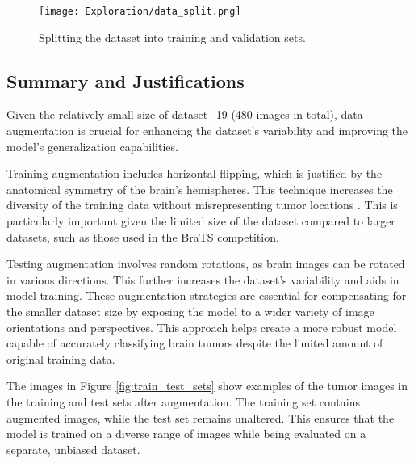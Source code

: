 \begin{figure}[H]
  \begin{center}
    \texttt{[image: Exploration/data\_split.png]}
  \end{center}
  \caption{Splitting the dataset into training and validation sets.}\label{fig:data_split}
\end{figure}


\subsection{Summary and Justifications}
Given the relatively small size of dataset\_19 (480 images in total), data augmentation is crucial for enhancing the dataset's variability and improving the model's generalization capabilities.

Training augmentation includes horizontal flipping, which is justified by the anatomical symmetry of the brain's hemispheres. This technique increases the diversity of the training data without misrepresenting tumor locations \cite{nalepa_data_2019}. This is particularly important given the limited size of the dataset compared to larger datasets, such as those used in the BraTS competition.

Testing augmentation involves random rotations, as brain images can be rotated in various directions. This further increases the dataset's variability and aids in model training. These augmentation strategies are essential for compensating for the smaller dataset size by exposing the model to a wider variety of image orientations and perspectives. This approach helps create a more robust model capable of accurately classifying brain tumors despite the limited amount of original training data.

The images in Figure \ref{fig:train_test_sets} show examples of the tumor images in the training and test sets after augmentation. The training set contains augmented images, while the test set remains unaltered. This ensures that the model is trained on a diverse range of images while being evaluated on a separate, unbiased dataset.
